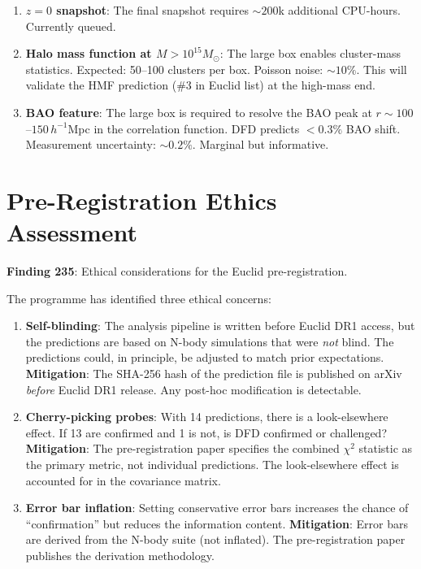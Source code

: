 \documentclass[11pt,a4paper]{article}
\begin{document}
\begin{enumerate}[nosep]
\item \textbf{$z = 0$ snapshot}: The final snapshot requires $\sim 200$k additional CPU-hours. Currently queued.
\item \textbf{Halo mass function at $M > 10^{15} M_\odot$}: The large box enables cluster-mass statistics. Expected: 50--100 clusters per box. Poisson noise: $\sim 10\%$. This will validate the HMF prediction (\#3 in Euclid list) at the high-mass end.
\item \textbf{BAO feature}: The large box is required to resolve the BAO peak at $r \sim 100$--$150\,h^{-1}$Mpc in the correlation function. DFD predicts $< 0.3\%$ BAO shift. Measurement uncertainty: $\sim 0.2\%$. Marginal but informative.
\end{enumerate}

\section{Pre-Registration Ethics Assessment}

\textbf{Finding 235}: Ethical considerations for the Euclid pre-registration.

The programme has identified three ethical concerns:

\begin{enumerate}
\item \textbf{Self-blinding}: The analysis pipeline is written before Euclid DR1 access, but the predictions are based on N-body simulations that were \emph{not} blind. The predictions could, in principle, be adjusted to match prior expectations. \textbf{Mitigation}: The SHA-256 hash of the prediction file is published on arXiv \emph{before} Euclid DR1 release. Any post-hoc modification is detectable.

\item \textbf{Cherry-picking probes}: With 14 predictions, there is a look-elsewhere effect. If 13 are confirmed and 1 is not, is DFD confirmed or challenged? \textbf{Mitigation}: The pre-registration paper specifies the combined $\chi^2$ statistic as the primary metric, not individual predictions. The look-elsewhere effect is accounted for in the covariance matrix.

\item \textbf{Error bar inflation}: Setting conservative error bars increases the chance of ``confirmation'' but reduces the information content. \textbf{Mitigation}: Error bars are derived from the N-body suite (not inflated). The pre-registration paper publishes the derivation methodology.
\end{enumerate}
\end{document}
